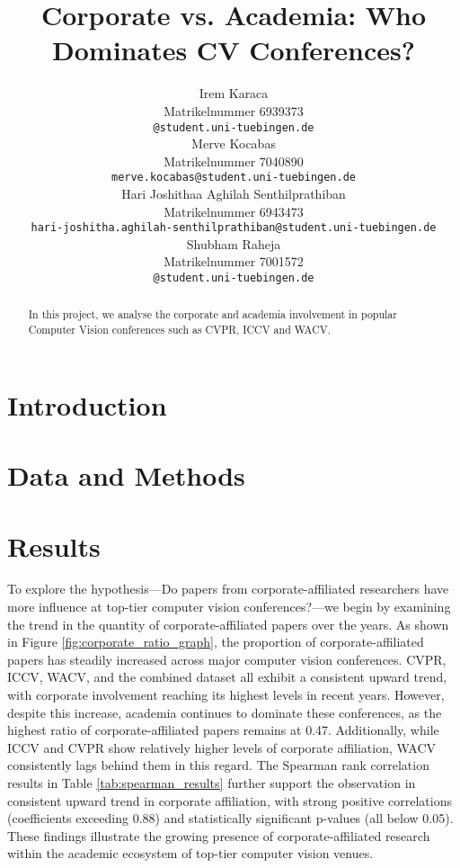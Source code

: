 \documentclass{article}
\title{Corporate vs. Academia: Who Dominates CV Conferences?}
\author{%
  Irem Karaca\\
  Matrikelnummer 6939373\\
  \texttt{@student.uni-tuebingen.de} \\
  \And
  Merve Kocabas\\
  Matrikelnummer 7040890\\
  \texttt{merve.kocabas@student.uni-tuebingen.de} \\
  \And
  Hari Joshithaa Aghilah Senthilprathiban\\
  Matrikelnummer 6943473\\
  \texttt{hari-joshitha.aghilah-senthilprathiban@student.uni-tuebingen.de} \\
  \And
  Shubham Raheja\\
  Matrikelnummer 7001572\\
  \texttt{@student.uni-tuebingen.de} \\
}
\begin{document}
\maketitle

\begin{abstract}

  In this project, we analyse the corporate and academia involvement in popular Computer Vision conferences such as CVPR, ICCV and WACV. 
\end{abstract}


\section{Introduction}


\section{Data and Methods}



\section{Results}
To explore the hypothesis—Do papers from corporate-affiliated researchers have more influence at top-tier computer vision conferences?—we begin by examining the trend in the quantity of corporate-affiliated papers over the years. As shown in Figure \ref{fig:corporate_ratio_graph}, the proportion of corporate-affiliated papers has steadily increased across major computer vision conferences. CVPR, ICCV, WACV, and the combined dataset all exhibit a consistent upward trend, with corporate involvement reaching its highest levels in recent years. However, despite this increase, academia continues to dominate these conferences, as the highest ratio of corporate-affiliated papers remains at 0.47. Additionally, while ICCV and CVPR show relatively higher levels of corporate affiliation, WACV consistently lags behind them in this regard. The Spearman rank correlation results in Table \ref{tab:spearman_results} further support the observation in consistent upward trend in corporate affiliation, with strong positive correlations (coefficients exceeding 0.88) and statistically significant p-values (all below 0.05). These findings illustrate the growing presence of corporate-affiliated research within the academic ecosystem of top-tier computer vision venues.
\end{document}
